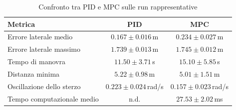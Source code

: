 \begin{table}[H]
    \centering
    \caption{Confronto tra PID e MPC sulle run rappresentative}
    \begin{tabular}{lcc}
        \toprule
        \textbf{Metrica} & \textbf{PID} & \textbf{MPC} \\
        \midrule
        Errore laterale medio & $0.167 \pm 0.016$\,m & $0.234 \pm 0.027$\,m \\
        Errore laterale massimo & $1.739 \pm 0.013$\,m & $1.745 \pm 0.012$\,m \\
        Tempo di manovra & $11.50 \pm 3.71$\,s & $15.10 \pm 5.85$\,s \\
        Distanza minima & $5.22 \pm 0.98$\,m & $5.01 \pm 1.51$\,m \\
        Oscillazione dello sterzo & $0.223 \pm 0.024$\,rad/s & $0.157 \pm 0.023$\,rad/s \\
        Tempo computazionale medio & n.d. & $27.53 \pm 2.02$\,ms \\
        \bottomrule
    \end{tabular}
\end{table}
